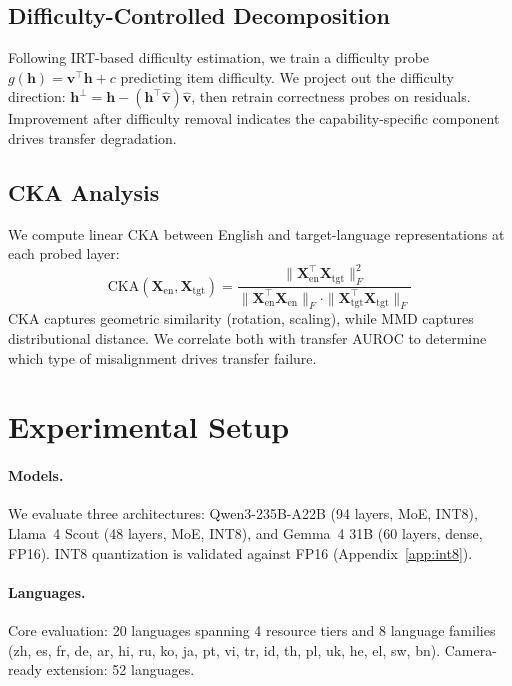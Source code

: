 \documentclass[11pt,a4paper]{article}
\begin{document}
\subsection{Difficulty-Controlled Decomposition}
\label{sec:decomp}

Following IRT-based difficulty estimation, we train a difficulty probe $g(\mathbf{h}) = \mathbf{v}^\top \mathbf{h} + c$ predicting item difficulty. We project out the difficulty direction: $\mathbf{h}^{\perp} = \mathbf{h} - (\mathbf{h}^\top \hat{\mathbf{v}})\hat{\mathbf{v}}$, then retrain correctness probes on residuals. Improvement after difficulty removal indicates the capability-specific component drives transfer degradation.

\subsection{CKA Analysis}
\label{sec:cka}

We compute linear CKA \cite{kornblith2019similarity} between English and target-language representations at each probed layer:
\begin{equation}
\text{CKA}(\mathbf{X}_{\text{en}}, \mathbf{X}_{\text{tgt}}) = \frac{\|\mathbf{X}_{\text{en}}^\top \mathbf{X}_{\text{tgt}}\|_F^2}{\|\mathbf{X}_{\text{en}}^\top \mathbf{X}_{\text{en}}\|_F \cdot \|\mathbf{X}_{\text{tgt}}^\top \mathbf{X}_{\text{tgt}}\|_F}
\end{equation}
CKA captures geometric similarity (rotation, scaling), while MMD captures distributional distance. We correlate both with transfer AUROC to determine which type of misalignment drives transfer failure.

\section{Experimental Setup}
\label{sec:setup}

\paragraph{Models.}
We evaluate three architectures: Qwen3-235B-A22B (94 layers, MoE, INT8), Llama~4 Scout (48 layers, MoE, INT8), and Gemma~4 31B (60 layers, dense, FP16). INT8 quantization is validated against FP16 (Appendix~\ref{app:int8}).

\paragraph{Languages.}
Core evaluation: 20 languages spanning 4 resource tiers and 8 language families (zh, es, fr, de, ar, hi, ru, ko, ja, pt, vi, tr, id, th, pl, uk, he, el, sw, bn). Camera-ready extension: 52 languages.
\end{document}
